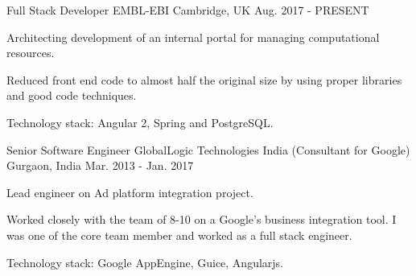 

\begin{cventries}

  \cventry
    {Full Stack Developer} %
    {EMBL-EBI} %
    {Cambridge, UK} %
    {Aug. 2017 - PRESENT} %
    {
      \begin{cvitems} %
        \item {Architecting development of an internal portal for managing computational resources.}
        \item {Reduced front end code to almost half the original size by using proper libraries and good code techniques.}
        \item {Technology stack: Angular 2, Spring and PostgreSQL.}
      \end{cvitems}
    }

  \cventry
    {Senior Software Engineer} %
    {GlobalLogic Technologies India (Consultant for Google)} %
    {Gurgaon, India} %
    {Mar. 2013 - Jan. 2017} %
    {
      \begin{cvitems} %
        \item {Lead engineer on Ad platform integration project.}
        \item {Worked closely with the team of 8-10 on a Google’s business integration tool. I was one of the core team member and worked as a full stack engineer.}
        \item {Technology stack: Google AppEngine, Guice, Angularjs.}
      \end{cvitems}
    }


\end{cventries}
